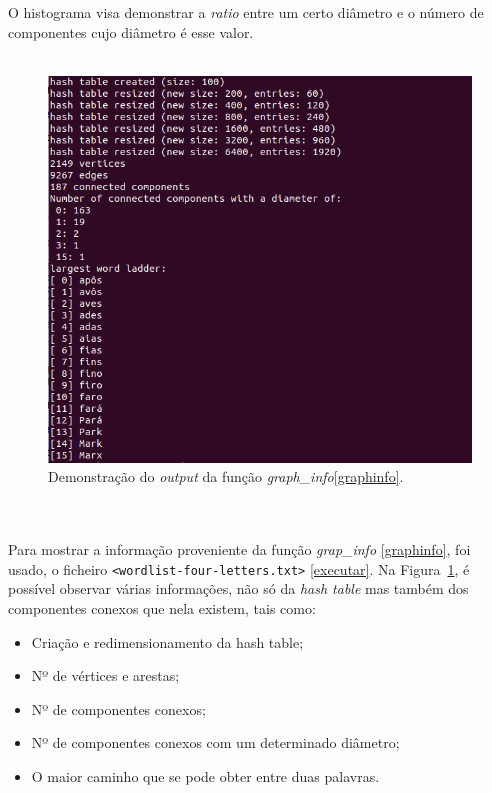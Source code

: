O histograma visa demonstrar a \textit{ratio} entre um certo diâmetro e o número de componentes cujo diâmetro é esse valor.\\\\
	
	\begin{figure}[h!]
    \centering
    \includegraphics[scale=0.40]{output.png}
    \caption{Demonstração do \textit{output} da função \textit{graph\_info}\ref{graphinfo}.}
    \label{fig:output}
	\end{figure}\\\\
\pagebreak
Para mostrar a informação proveniente da função \textit{grap\_info} \ref{graphinfo}, foi usado, o ficheiro \verb|<wordlist-four-letters.txt>| \ref{executar}. Na Figura~\ref{fig:output}, é possível observar várias informações, não só da \textit{hash table} mas também dos componentes conexos que nela existem, tais como:
\begin{itemize}
\item Criação e redimensionamento da hash table;
\item Nº de vértices e arestas;
\item Nº de componentes conexos;
\item Nº de componentes conexos com um determinado diâmetro;
\item O maior caminho que se pode obter entre duas palavras.\\\\
\end{itemize}
